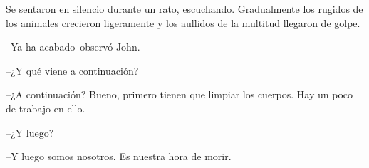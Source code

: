 Se sentaron en silencio durante un rato, escuchando. Gradualmente los
rugidos de los animales crecieron ligeramente y los aullidos de la
multitud llegaron de golpe.

--Ya ha acabado--observó John.

--¿Y qué viene a continuación?

--¿A continuación? Bueno, primero tienen que limpiar los cuerpos. Hay un
poco de trabajo en ello.

--¿Y luego?

--Y luego somos nosotros. Es nuestra hora de morir.
